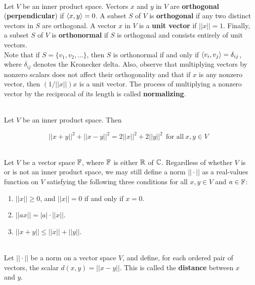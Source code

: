 \begin{definition}
	\hfill\\
	Let $V$ be an inner product space. Vectors $x$ and $y$ in $V$ are \textbf{orthogonal} (\textbf{perpendicular}) if $\langle x,y\rangle = 0$. A subset $S$ of $V$ is \textbf{orthogonal} if any two distinct vectors in $S$ are orthogonal. A vector $x$ in $V$ is a \textbf{unit vector} if $||x|| = 1$. Finally, a subset $S$ of $V$ is \textbf{orthonormal} if $S$ is orthogonal and consists entirely of unit vectors.\\

	Note that if $S = \{v_1, v_2, \dots\}$, then $S$ is orthonormal if and only if $\langle v_i, v_j\rangle = \delta_{ij}$, where $\delta_{ij}$ denotes the Kronecker delta. Also, observe that multiplying vectors by nonzero scalars does not affect their orthogonality and that if $x$ is any nonzero vector, then $(1/||x||)x$ is a unit vector. The process of multiplying a nonzero vector by the reciprocal of its length is called \textbf{normalizing}.
\end{definition}

\begin{lemma}
	\hfill\\
	Let $V$ be an inner product space. Then

	\[||x + y||^2 + ||x - y||^2 = 2||x||^2 + 2||y||^2\ \ \text{for all}\ x,y \in V\]
\end{lemma}

\begin{definition}
	\hfill\\
	Let $V$ be a vector space $\mathbb{F}$, where $\mathbb{F}$ is either $\mathbb{R}$ of $\mathbb{C}$. Regardless of whether $V$ is or is not an inner product space, we may still define a norm $||\cdot||$ as a real-values function on $V$ satisfying the following three conditions for all $x,y \in V$ and $a \in \mathbb{F}$:

	\begin{enumerate}
		\item $||x|| \geq 0$, and $||x|| = 0$ if and only if $x = 0$.
		\item $||ax|| = |a| \cdot ||x||$.
		\item $||x + y|| \leq ||x|| + ||y||$.
	\end{enumerate}
\end{definition}

\begin{definition}
	\hfill\\
	Let $||\cdot||$ be a norm on a vector space $V$, and define, for each ordered pair of vectors, the scalar $d(x, y) = ||x - y||$. This is called the \textbf{distance} between $x$ and $y$.
\end{definition}
